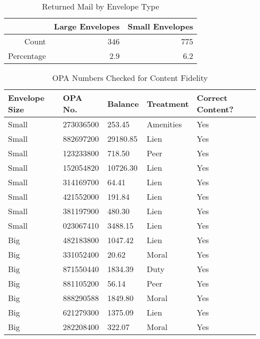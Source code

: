 
\begin{table}[ht]
\centering
\begin{tabular}{rrr}
  \hline
 & Large Envelopes & Small Envelopes \\ 
  \hline
Count & 346 & 775 \\ 
  Percentage & 2.9 & 6.2 \\ 
   \hline
\end{tabular}
\caption{Returned Mail by Envelope Type} 
\label{table_return_env}
\end{table}


\begin{table}[ht]
\centering
\begin{tabular}{lllll}
  \hline
Envelope Size & OPA No. & Balance & Treatment & Correct Content? \\ 
  \hline
Small & 273036500 &  253.45 & Amenities & Yes \\ 
  Small & 882697200 & 29180.85 & Lien & Yes \\ 
  Small & 123233800 &  718.50 & Peer & Yes \\ 
  Small & 152054820 & 10726.30 & Lien & Yes \\ 
  Small & 314169700 &   64.41 & Lien & Yes \\ 
  Small & 421552000 &  191.84 & Lien & Yes \\ 
  Small & 381197900 &  480.30 & Lien & Yes \\ 
  Small & 023067410 & 3488.15 & Lien & Yes \\ 
  Big & 482183800 & 1047.42 & Lien & Yes \\ 
  Big & 331052400 &   20.62 & Moral & Yes \\ 
  Big & 871550440 & 1834.39 & Duty & Yes \\ 
  Big & 881105200 &   56.14 & Peer & Yes \\ 
  Big & 888290588 & 1849.80 & Moral & Yes \\ 
  Big & 621279300 & 1375.09 & Lien & Yes \\ 
  Big & 282208400 &  322.07 & Moral & Yes \\ 
   \hline
\end{tabular}
\caption{OPA Numbers Checked for Content Fidelity} 
\label{table_content_fidelity}
\end{table}



